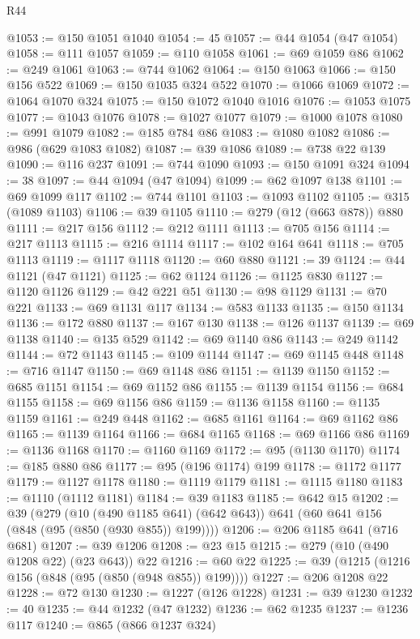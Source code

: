 \begin{lexlean}{R44}
\begin{coremodule}
@1053 := @150 @1051 @1040
@1054 := 45
@1057 := @44 @1054 (@47 @1054)
@1058 := @111 @1057
@1059 := @110 @1058
@1061 := @69 @1059 @86
@1062 := @249 @1061
@1063 := @744 @1062
@1064 := @150 @1063
@1066 := @150 @156 @522
@1069 := @150 @1035 @324 @522
@1070 := @1066 @1069
@1072 := @1064 @1070 @324
@1075 := @150 @1072 @1040 @1016
@1076 := @1053 @1075
@1077 := @1043 @1076
@1078 := @1027 @1077
@1079 := @1000 @1078
@1080 := @991 @1079
@1082 := @185 @784 @86
@1083 := @1080 @1082
@1086 := @986 (@629 @1083 @1082)
@1087 := @39 @1086
@1089 := @738 @22 @139
@1090 := @116 @237
@1091 := @744 @1090
@1093 := @150 @1091 @324
@1094 := 38
@1097 := @44 @1094 (@47 @1094)
@1099 := @62 @1097 @138
@1101 := @69 @1099 @117
@1102 := @744 @1101
@1103 := @1093 @1102
@1105 := @315 (@1089 @1103)
@1106 := @39 @1105
@1110 := @279 (@12 (@663 @878)) @880
@1111 := @217 @156
@1112 := @212 @1111
@1113 := @705 @156
@1114 := @217 @1113
@1115 := @216 @1114
@1117 := @102 @164 @641
@1118 := @705 @1113
@1119 := @1117 @1118
@1120 := @60 @880
@1121 := 39
@1124 := @44 @1121 (@47 @1121)
@1125 := @62 @1124
@1126 := @1125 @830
@1127 := @1120 @1126
@1129 := @42 @221 @51
@1130 := @98 @1129
@1131 := @70 @221
@1133 := @69 @1131 @117
@1134 := @583 @1133
@1135 := @150 @1134
@1136 := @172 @880
@1137 := @167 @130
@1138 := @126 @1137
@1139 := @69 @1138
@1140 := @135 @529
@1142 := @69 @1140 @86
@1143 := @249 @1142
@1144 := @72 @1143
@1145 := @109 @1144
@1147 := @69 @1145 @448
@1148 := @716 @1147
@1150 := @69 @1148 @86
@1151 := @1139 @1150
@1152 := @685 @1151
@1154 := @69 @1152 @86
@1155 := @1139 @1154
@1156 := @684 @1155
@1158 := @69 @1156 @86
@1159 := @1136 @1158
@1160 := @1135 @1159
@1161 := @249 @448
@1162 := @685 @1161
@1164 := @69 @1162 @86
@1165 := @1139 @1164
@1166 := @684 @1165
@1168 := @69 @1166 @86
@1169 := @1136 @1168
@1170 := @1160 @1169
@1172 := @95 (@1130 @1170)
@1174 := @185 @880 @86
@1177 := @95 (@196 @1174) @199
@1178 := @1172 @1177
@1179 := @1127 @1178
@1180 := @1119 @1179
@1181 := @1115 @1180
@1183 := @1110 (@1112 @1181)
@1184 := @39 @1183
@1185 := @642 @15
@1202 := @39
    (@279
      (@10 (@490 @1185 @641) (@642 @643))
      @641
      (@60 @641 @156 (@848 (@95 (@850 (@930 @855)) @199))))
@1206 := @206 @1185 @641 (@716 @681)
@1207 := @39 @1206
@1208 := @23 @15
@1215 := @279 (@10 (@490 @1208 @22) (@23 @643)) @22
@1216 := @60 @22
@1225 := @39 (@1215 (@1216 @156 (@848 (@95 (@850 (@948 @855)) @199))))
@1227 := @206 @1208 @22
@1228 := @72 @130
@1230 := @1227 (@126 @1228)
@1231 := @39 @1230
@1232 := 40
@1235 := @44 @1232 (@47 @1232)
@1236 := @62 @1235
@1237 := @1236 @117
@1240 := @865 (@866 @1237 @324)

\end{coremodule}
\end{lexlean}

